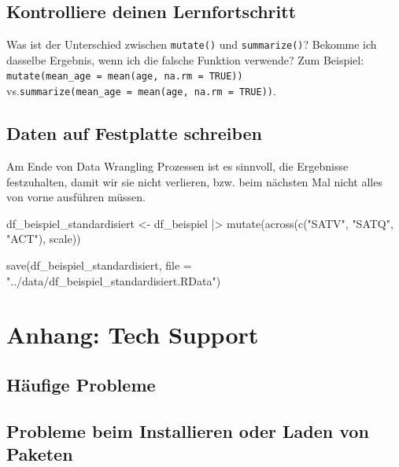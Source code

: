 \documentclass[
  letterpaper,
  DIV=11,
  numbers=noendperiod]{scrreprt}
\newenvironment{Shaded}{\begin{snugshade}}{\end{snugshade}}
\newcommand{\AttributeTok}[1]{\textcolor[rgb]{0.40,0.45,0.13}{#1}}
\newcommand{\FunctionTok}[1]{\textcolor[rgb]{0.28,0.35,0.67}{#1}}
\newcommand{\NormalTok}[1]{\textcolor[rgb]{0.00,0.23,0.31}{#1}}
\newcommand{\OtherTok}[1]{\textcolor[rgb]{0.00,0.23,0.31}{#1}}
\newcommand{\SpecialCharTok}[1]{\textcolor[rgb]{0.37,0.37,0.37}{#1}}
\newcommand{\StringTok}[1]{\textcolor[rgb]{0.13,0.47,0.30}{#1}}
\begin{document}
\section{Kontrolliere deinen
Lernfortschritt}\label{kontrolliere-deinen-lernfortschritt}

Was ist der Unterschied zwischen \texttt{mutate()} und
\texttt{summarize()}? Bekomme ich dasselbe Ergebnis, wenn ich die
falsche Funktion verwende? Zum Beispiel:
\texttt{mutate(mean\_age\ =\ mean(age,\ na.rm\ =\ TRUE))}
vs.\texttt{summarize(mean\_age\ =\ mean(age,\ na.rm\ =\ TRUE))}.

\section{Daten auf Festplatte
schreiben}\label{daten-auf-festplatte-schreiben}

Am Ende von Data Wrangling Prozessen ist es sinnvoll, die Ergebnisse
festzuhalten, damit wir sie nicht verlieren, bzw. beim nächsten Mal
nicht alles von vorne ausführen müssen.

\begin{Shaded}
\begin{Highlighting}[]
\NormalTok{df\_beispiel\_standardisiert }\OtherTok{\textless{}{-}}\NormalTok{ df\_beispiel }\SpecialCharTok{|\textgreater{}} \FunctionTok{mutate}\NormalTok{(}\FunctionTok{across}\NormalTok{(}\FunctionTok{c}\NormalTok{(}\StringTok{"SATV"}\NormalTok{, }\StringTok{"SATQ"}\NormalTok{, }\StringTok{"ACT"}\NormalTok{),}
\NormalTok{                                                           scale))}

\FunctionTok{save}\NormalTok{(df\_beispiel\_standardisiert, }\AttributeTok{file =}  \StringTok{"../data/df\_beispiel\_standardisiert.RData"}\NormalTok{)}
\end{Highlighting}
\end{Shaded}


\chapter{Anhang: Tech Support}\label{anhang-tech-support}

\section{Häufige Probleme}\label{huxe4ufige-probleme}

\section{Probleme beim Installieren oder Laden von
Paketen}\label{probleme-beim-installieren-oder-laden-von-paketen}
\end{document}
